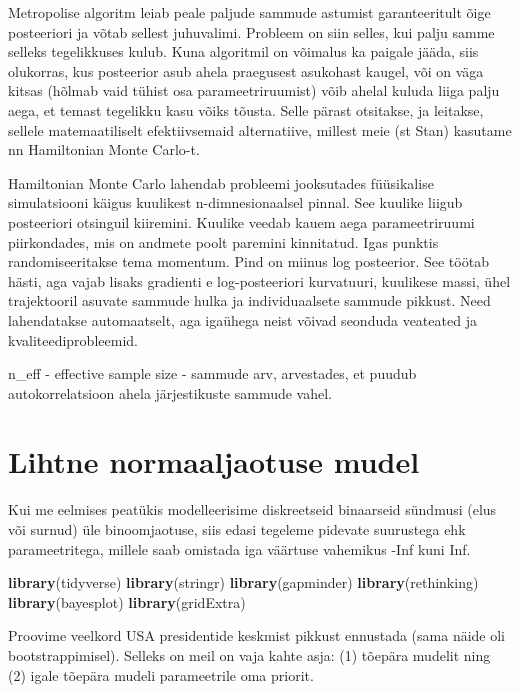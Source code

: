\documentclass[]{book}
\newenvironment{Shaded}{\begin{snugshade}}{\end{snugshade}}
\newcommand{\KeywordTok}[1]{\textcolor[rgb]{0.13,0.29,0.53}{\textbf{#1}}}
\newcommand{\NormalTok}[1]{#1}
\begin{document}
Metropolise algoritm leiab peale paljude sammude astumist garanteeritult õige posteeriori ja võtab sellest juhuvalimi. Probleem on siin selles, kui palju samme selleks tegelikkuses kulub. Kuna algoritmil on võimalus ka paigale jääda, siis olukorras, kus posteerior asub ahela praegusest asukohast kaugel, või on väga kitsas (hõlmab vaid tühist osa parameetriruumist) võib ahelal kuluda liiga palju aega, et temast tegelikku kasu võiks tõusta. Selle pärast otsitakse, ja leitakse, sellele matemaatiliselt efektiivsemaid alternatiive, millest meie (st Stan) kasutame nn Hamiltonian Monte Carlo-t.

Hamiltonian Monte Carlo lahendab probleemi jooksutades füüsikalise simulatsiooni käigus kuulikest n-dimnesionaalsel pinnal. See kuulike liigub posteeriori otsinguil kiiremini. Kuulike veedab kauem aega parameetriruumi piirkondades, mis on andmete poolt paremini kinnitatud. Igas punktis randomiseeritakse tema momentum. Pind on miinus log posteerior. See töötab hästi, aga vajab lisaks gradienti e log-posteeriori kurvatuuri, kuulikese massi, ühel trajektooril asuvate sammude hulka ja individuaalsete sammude pikkust. Need lahendatakse automaatselt, aga igaühega neist võivad seonduda veateated ja kvaliteediprobleemid.

n\_eff - effective sample size - sammude arv, arvestades, et puudub autokorrelatsioon ahela järjestikuste sammude vahel.

\hypertarget{lihtne-normaaljaotuse-mudel}{%
\chapter{Lihtne normaaljaotuse mudel}\label{lihtne-normaaljaotuse-mudel}}

Kui me eelmises peatükis modelleerisime diskreetseid binaarseid sündmusi (elus või surnud) üle binoomjaotuse, siis edasi tegeleme pidevate suurustega ehk parameetritega, millele saab omistada iga väärtuse vahemikus -Inf kuni Inf.

\begin{Shaded}
\begin{Highlighting}[]
\KeywordTok{library}\NormalTok{(tidyverse)}
\KeywordTok{library}\NormalTok{(stringr)}
\KeywordTok{library}\NormalTok{(gapminder)}
\KeywordTok{library}\NormalTok{(rethinking)}
\KeywordTok{library}\NormalTok{(bayesplot)}
\KeywordTok{library}\NormalTok{(gridExtra)}
\end{Highlighting}
\end{Shaded}

Proovime veelkord USA presidentide keskmist pikkust ennustada (sama näide oli bootstrappimisel).
Selleks on meil on vaja kahte asja: (1) tõepära mudelit ning (2) igale tõepära mudeli parameetrile oma priorit.
\end{document}

